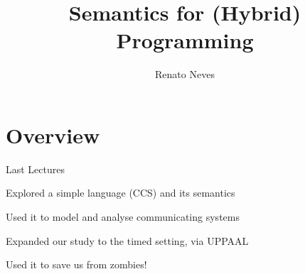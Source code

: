 \documentclass{beamer}
\author[Renato Neves]{Renato Neves}
\date{}
\begin{document}
\title{Semantics for (Hybrid) Programming}

\frame[plain]{\titlepage}

\section{Overview}

\begin{frame}{Last Lectures}
       
       Explored a simple language (\textsc{CCS}) and its semantics

       Used it to model and analyse \alert{communicating} systems

       Expanded our study to the \alert{timed} setting, via \textsc{UPPAAL}
       
       Used it to save us from zombies!

\end{frame}
\end{document}
